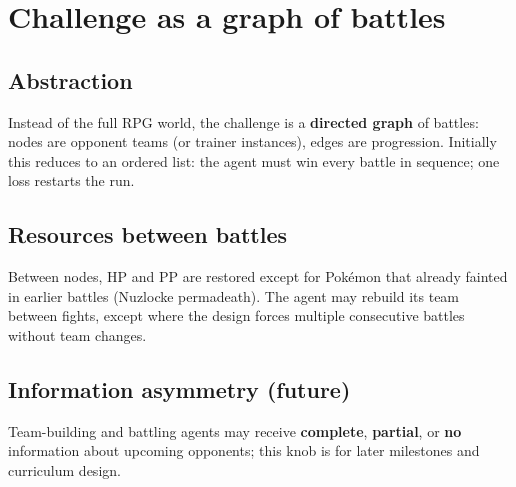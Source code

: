 \chapter{Challenge as a graph of battles}

\section{Abstraction}
Instead of the full RPG world, the challenge is a \textbf{directed graph} of battles: nodes are opponent teams (or trainer instances), edges are progression. Initially this reduces to an ordered list: the agent must win every battle in sequence; one loss restarts the run.

\section{Resources between battles}
Between nodes, HP and PP are restored except for Pok\'{e}mon that already fainted in earlier battles (Nuzlocke permadeath). The agent may rebuild its team between fights, except where the design forces multiple consecutive battles without team changes.

\section{Information asymmetry (future)}
Team-building and battling agents may receive \textbf{complete}, \textbf{partial}, or \textbf{no} information about upcoming opponents; this knob is for later milestones and curriculum design.

